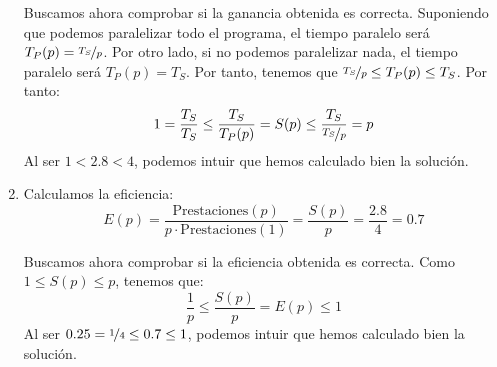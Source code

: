 \begin{ejercicio}
\begin{enumerate}
        \begin{observacion}
            Buscamos ahora comprobar si la ganancia obtenida es correcta.
            Suponiendo que podemos paralelizar todo el programa, el tiempo paralelo será $T_P(p) = \nicefrac{T_S}{p}$.
            Por otro lado, si no podemos paralelizar nada, el tiempo paralelo será $T_P(p) = T_S$. Por tanto, tenemos que $\nicefrac{T_S}{p}\leq T_P(p) \leq T_S$.
            Por tanto:
            \begin{equation*}
                1 = \dfrac{T_S}{T_S} \leq \dfrac{T_S}{T_P(p)} = S(p) \leq \dfrac{T_S}{\nicefrac{T_S}{p}} = p
            \end{equation*}
            Al ser $1 < 2.8 < 4$, podemos intuir que hemos calculado bien la solución.
        \end{observacion}

        \item
        Calculamos la eficiencia:
        \begin{equation*}
            E(p) = \dfrac{\text{Prestaciones}(p)}{p\cdot \text{Prestaciones}(1)} = \dfrac{S(p)}{p} = \dfrac{2.8}{4} = 0.7
        \end{equation*}

        \begin{observacion}
            Buscamos ahora comprobar si la eficiencia obtenida es correcta.
            Como $1\leq S(p)\leq p$, tenemos que:
            \begin{equation*}
                \dfrac{1}{p} \leq \dfrac{S(p)}{p} = E(p) \leq 1
            \end{equation*}
            Al ser $0.25=\nicefrac{1}{4} \leq 0.7 \leq 1$, podemos intuir que hemos calculado bien la solución.
        \end{observacion}
        
    \end{enumerate}
\end{ejercicio}

